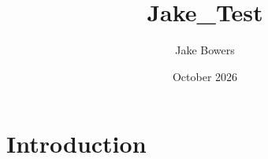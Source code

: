 \documentclass{article}
\title{Jake_Test}
\author{Jake Bowers}
\date{October 2026}
\begin{document}
\maketitle

\section{Introduction}
\end{document}
